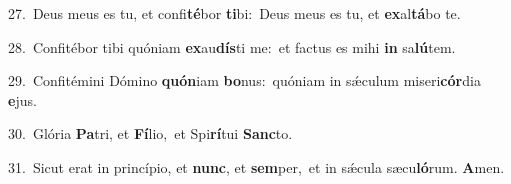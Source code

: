 {\numbfont\textcolor{\numbcolor}{27.}}~Deus meus es tu, et confi\-\textbf{té}\-bor \textbf{ti}\-bi:~\star Deus meus es tu, et \textbf{ex}\-al\-\textbf{tá}\-bo te.\par
{\numbfont\textcolor{\numbcolor}{28.}}~Confitébor tibi quóniam \textbf{ex}\-au\-\textbf{dís}\-ti me:~\star et factus es mihi \textbf{in} sa\-\textbf{lú}\-tem.\par
{\numbfont\textcolor{\numbcolor}{29.}}~Confitémini Dómino \textbf{quón}\-iam \textbf{bo}\-nus:~\star quóniam in sǽculum miseri\-\textbf{cór}\-dia \textbf{e}\-jus.\par
{\numbfont\textcolor{\numbcolor}{30.}}~Glória \textbf{Pa}\-tri, et \textbf{Fí}\-lio,~\star et Spi\-\textbf{rí}\-tui \textbf{Sanc}\-to.\par
{\numbfont\textcolor{\numbcolor}{31.}}~Sicut erat in princípio, et \textbf{nunc}\-, et \textbf{sem}\-per,~\star et in sǽcula sæcu\-\textbf{ló}\-rum. \textbf{A}\-men.\par
